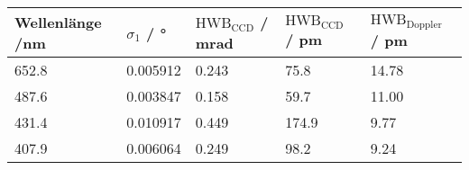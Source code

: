 \begin{tabular}{lllll}
\toprule
Wellenlänge /\si{\nano\metre} & $\sigma_1$ / \si{\degree} & $\mathrm{HWB}_\mathrm{CCD}$ / \si{\milli\radian} & $\mathrm{HWB}_\mathrm{CCD}$ / \si{\pico\metre} & $\mathrm{HWB}_\mathrm{Doppler}$ / \si{\pico\metre} \\
\midrule
\num{652.8}& \num{0.005912}       & \num{0.243} & \num{75.8}  & \num{14.78} \\
\num{487.6}& \num{0.003847}       & \num{0.158} & \num{59.7}  & \num{11.00} \\
\num{431.4}& \num{0.010917}       & \num{0.449} & \num{174.9} & \num{9.77}  \\
\num{407.9}& \num{0.006064}       & \num{0.249} & \num{98.2}  & \num{9.24}  \\
\bottomrule
\end{tabular}
